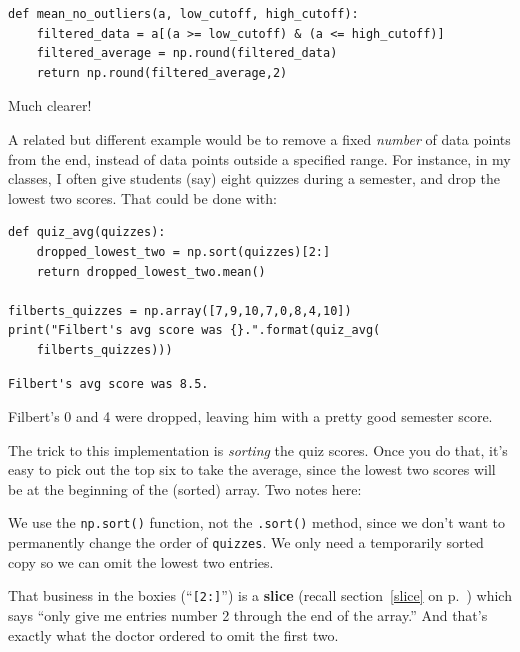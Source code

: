 \begin{Verbatim}[fontsize=\footnotesize,samepage=true,frame=single,framesep=3mm]
def mean_no_outliers(a, low_cutoff, high_cutoff):
    filtered_data = a[(a >= low_cutoff) & (a <= high_cutoff)]
    filtered_average = np.round(filtered_data)
    return np.round(filtered_average,2)
\end{Verbatim}

Much clearer!

\medskip

A related but different example would be to remove a fixed \textit{number} of
data points from the end, instead of data points outside a specified range. For
instance, in my classes, I often give students (say) eight quizzes during a
semester, and drop the lowest two scores. That could be done with:


\begin{Verbatim}[fontsize=\footnotesize,samepage=true,frame=single,framesep=3mm]
def quiz_avg(quizzes):
    dropped_lowest_two = np.sort(quizzes)[2:]
    return dropped_lowest_two.mean()

filberts_quizzes = np.array([7,9,10,7,0,8,4,10])
print("Filbert's avg score was {}.".format(quiz_avg(
    filberts_quizzes)))
\end{Verbatim}
\vspace{-.2in}

\begin{Verbatim}[fontsize=\small,samepage=true,frame=leftline,framesep=5mm,framerule=1mm]
Filbert's avg score was 8.5.
\end{Verbatim}

Filbert's 0 and 4 were dropped, leaving him with a pretty good semester score.

The trick to this implementation is \textit{sorting} the quiz scores. Once you
do that, it's easy to pick out the top six to take the average, since the
lowest two scores will be at the beginning of the (sorted) array. Two notes
here:


\begin{compactitem}

\item We use the \texttt{np.sort()} function, not the \texttt{.sort()} method,
since we don't want to permanently change the order of \texttt{quizzes}. We
only need a temporarily sorted copy so we can omit the lowest two entries.


\item That business in the boxies (``\texttt{[2:]}'') is a \textbf{slice}
(recall section~\ref{slice} on p.~\pageref{slice}) which says ``only give me
entries number 2 through the end of the array.'' And that's exactly what the
doctor ordered to omit the first two. \end{compactitem}

